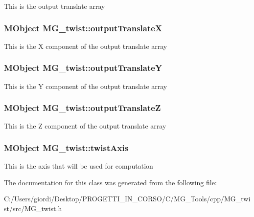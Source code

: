 This is the output translate array \hypertarget{class_m_g__twist_a290ab074cc022d06d1498fa3a96e1d20}{
\subsubsection[{output\-Translate\-X}]{\setlength{\rightskip}{0pt plus 5cm}M\-Object M\-G\-\_\-twist\-::output\-Translate\-X\hspace{0.3cm}{\ttfamily [static]}}}\label{class_m_g__twist_a290ab074cc022d06d1498fa3a96e1d20}
This is the X component of the output translate array \hypertarget{class_m_g__twist_acf377991d45f3bda1fb51bc6509d6d81}{
\subsubsection[{output\-Translate\-Y}]{\setlength{\rightskip}{0pt plus 5cm}M\-Object M\-G\-\_\-twist\-::output\-Translate\-Y\hspace{0.3cm}{\ttfamily [static]}}}\label{class_m_g__twist_acf377991d45f3bda1fb51bc6509d6d81}
This is the Y component of the output translate array \hypertarget{class_m_g__twist_a4dda83e85c12b6a8b58775bf1b3d38bb}{
\subsubsection[{output\-Translate\-Z}]{\setlength{\rightskip}{0pt plus 5cm}M\-Object M\-G\-\_\-twist\-::output\-Translate\-Z\hspace{0.3cm}{\ttfamily [static]}}}\label{class_m_g__twist_a4dda83e85c12b6a8b58775bf1b3d38bb}
This is the Z component of the output translate array \hypertarget{class_m_g__twist_a8b36730a0d0d26103ebcd04b26479c23}{
\subsubsection[{twist\-Axis}]{\setlength{\rightskip}{0pt plus 5cm}M\-Object M\-G\-\_\-twist\-::twist\-Axis\hspace{0.3cm}{\ttfamily [static]}}}\label{class_m_g__twist_a8b36730a0d0d26103ebcd04b26479c23}
This is the axis that will be used for computation 

The documentation for this class was generated from the following file\-:\begin{DoxyCompactItemize}
\item 
C\-:/\-Users/giordi/\-Desktop/\-P\-R\-O\-G\-E\-T\-T\-I\-\_\-\-I\-N\-\_\-\-C\-O\-R\-S\-O/\-C/\-M\-G\-\_\-\-Tools/cpp/\-M\-G\-\_\-twist/src/M\-G\-\_\-twist.\-h\end{DoxyCompactItemize}
